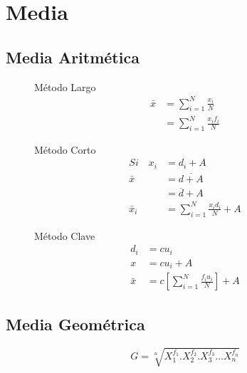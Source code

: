         \section{Media}

\subsection{Media Aritmética}

\begin{figure}[!h]

\begin{minipage}[t]{0.3\textwidth}
	Método Largo
	\begin{align*}
	\bar { x } 	& =\sum _{ i=1 }^{ N }{ \frac { { x }_{ i } }{ N }  } 			\\
				& =\sum _{ i=1 }^{ N }{ \frac { { x }_{ i }{ f }_{ i } }{ N }  } 
	\end{align*}
\end{minipage} \hfill \begin{minipage}[t]{0.3\textwidth}
	Método Corto
	\begin{align*}
	Si \quad {x}_{i}	& ={ d }_{ i }+A 				\\
		\bar{x}			& =\overline {d+A} 				\\
						& =\overline {d}+A 				\\
		\bar {x}_{i}	& =\sum _{ i=1 }^{ N }{ \frac { { x }_{ i }{ d }_{ i } }{ N } + A  }
	\end{align*}
\end{minipage} \hfill \begin{minipage}[t]{0.3\textwidth}
	Método Clave
	\begin{align*}
	{d}_{i}				& =c{u}_{i}						\\
				x		& =c{u}_{i} + A					\\
				\bar{x} & =c\left[ \sum _{ i=1 }^{ N }{ \frac { { f }_{ i }{ u }_{ i } }{ N }  }  \right] +A
	\end{align*}

\end{minipage}
\end{figure}

\subsection{Media Geométrica}
    \begin{equation*}
G=\sqrt [ n ]{ { X }_{ 1 }^{ { f }_{ 1 } }.{ X }_{ 2 }^{ { f }_{ 2 } }.{ X }_{ 3 }^{ { f }_{ 3 } }\dots { X }_{ n}^{ { f }_{ n} } } 
    \end{equation*}
